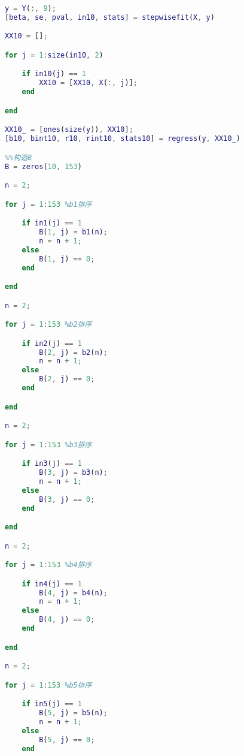 \begin{appendices}
\begin{lstlisting}[language=matlab]
            %%管道10
            y = Y(:, 9);
            [beta, se, pval, in10, stats] = stepwisefit(X, y)

            XX10 = [];

            for j = 1:size(in10, 2)

                if in10(j) == 1
                    XX10 = [XX10, X(:, j)];
                end

            end

            XX10_ = [ones(size(y)), XX10];
            [b10, bint10, r10, rint10, stats10] = regress(y, XX10_)

            %%构造B
            B = zeros(10, 153)

            n = 2;

            for j = 1:153 %b1排序

                if in1(j) == 1
                    B(1, j) = b1(n);
                    n = n + 1;
                else
                    B(1, j) == 0;
                end

            end

            n = 2;

            for j = 1:153 %b2排序

                if in2(j) == 1
                    B(2, j) = b2(n);
                    n = n + 1;
                else
                    B(2, j) == 0;
                end

            end

            n = 2;

            for j = 1:153 %b3排序

                if in3(j) == 1
                    B(3, j) = b3(n);
                    n = n + 1;
                else
                    B(3, j) == 0;
                end

            end

            n = 2;

            for j = 1:153 %b4排序

                if in4(j) == 1
                    B(4, j) = b4(n);
                    n = n + 1;
                else
                    B(4, j) == 0;
                end

            end

            n = 2;

            for j = 1:153 %b5排序

                if in5(j) == 1
                    B(5, j) = b5(n);
                    n = n + 1;
                else
                    B(5, j) == 0;
                end


\end{lstlisting}
\end{appendices}

